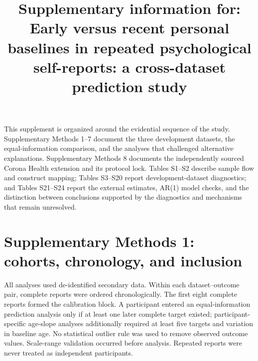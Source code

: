 \documentclass[pdflatex,sn-vancouver-num]{sn-jnl}
\begin{document}
\renewcommand{\thetable}{S\arabic{table}}

\title{Supplementary information for: Early versus recent personal baselines in repeated psychological self-reports: a cross-dataset prediction study}
\author[1]{ }
\author[2]{ }
\author*[1]{ }
\maketitle

This supplement is organized around the evidential sequence of the study. Supplementary Methods 1--7 document the three development datasets, the equal-information comparison, and the analyses that challenged alternative explanations. Supplementary Methods 8 documents the independently sourced Corona Health extension and its protocol lock. Tables S1--S2 describe sample flow and construct mapping; Tables S3--S20 report development-dataset diagnostics; and Tables S21--S24 report the external estimates, AR(1) model checks, and the distinction between conclusions supported by the diagnostics and mechanisms that remain unresolved.

\section{Supplementary Methods 1: cohorts, chronology, and inclusion}

All analyses used de-identified secondary data. Within each dataset--outcome pair, complete reports were ordered chronologically. The first eight complete reports formed the calibration block. A participant entered an equal-information prediction analysis only if at least one later complete target existed; participant-specific age-slope analyses additionally required at least five targets and variation in baseline age. No statistical outlier rule was used to remove observed outcome values. Scale-range validation occurred before analysis. Repeated reports were never treated as independent participants.
\end{document}
